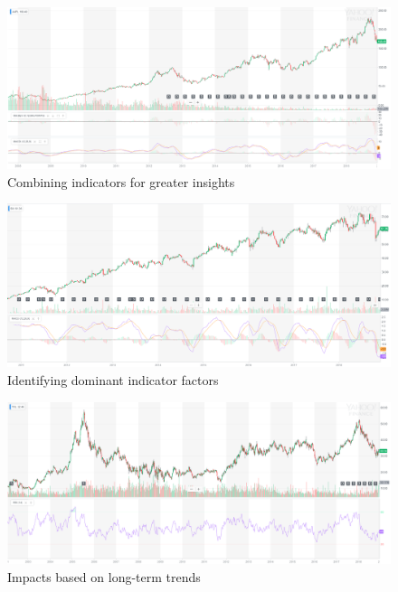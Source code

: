 \documentclass{article}
\begin{document}
\vspace{10pt}

\begin{figure}[!htb]
    \centering
    \includegraphics[width=\textwidth]{imgs/75.png}
    \caption{Combining indicators for greater insights}
\end{figure}

\vspace{10pt}

\begin{figure}[!htb]
    \centering
    \includegraphics[width=\textwidth]{imgs/76.png}
    \caption{Identifying dominant indicator factors}
\end{figure}

\vspace{10pt}

\begin{figure}[!htb]
    \centering
    \includegraphics[width=\textwidth]{imgs/77.png}
    \caption{Impacts based on long-term trends}
\end{figure}
\end{document}
